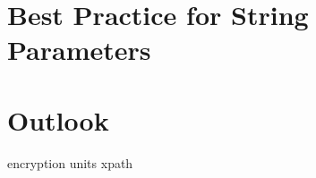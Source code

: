 \documentclass{modelica}
\begin{document}
\section{Best Practice for String Parameters}


\section{Outlook}
encryption
units
xpath






\end{document}
